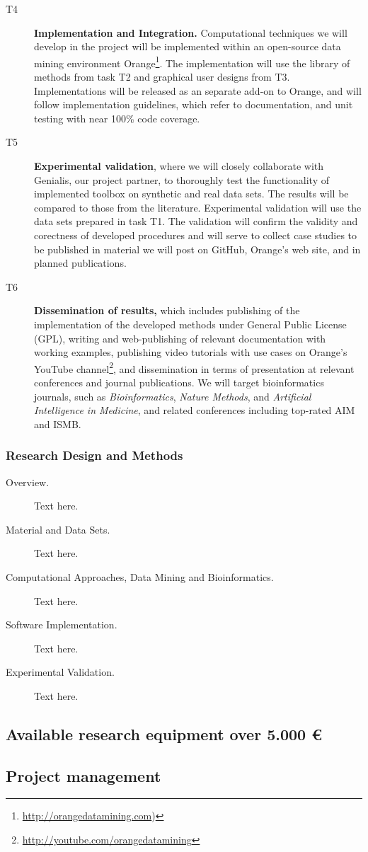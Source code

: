 \documentclass[11pt,a4paper]{article}
\renewcommand{\bf}{\textbf}
\begin{document}
\begin{description}
	\item[T4] \bf{Implementation and Integration.} Computational techniques we will develop in the project will be implemented within an open-source data mining environment Orange\footnote{\url{http://orangedatamining.com})}. The implementation will use the library of methods from task T2 and graphical user designs from T3. Implementations will be released as an separate add-on to Orange, and will follow implementation guidelines, which refer to documentation, and unit testing with near 100\% code coverage.
	\item[T5] \bf{Experimental validation}, where we will closely collaborate with Genialis, our project partner, to thoroughly test the functionality of implemented toolbox on synthetic and real data sets. The results will be compared to those from the literature. Experimental validation will use the data sets prepared in task T1. The validation will confirm the validity and corectness of developed procedures and will serve to collect case studies to be published in material we will post on GitHub, Orange's web site, and in planned publications.
	\item[T6] \bf{Dissemination of results,} which includes publishing of the implementation of the developed methods under General Public License (GPL), writing and web-publishing of relevant documentation with working examples, publishing video tutorials with use cases on Orange's YouTube channel\footnote{\url{http://youtube.com/orangedatamining}}, and dissemination in terms of presentation at relevant conferences and journal publications. We will target bioinformatics journals, such as {\em Bioinformatics}, {\em Nature Methods}, and {\em Artificial Intelligence in Medicine}, and related conferences including top-rated AIM and ISMB.
\end{description}

\subsubsection{Research Design and Methods}
\begin{description}
	\item[Overview.] Text here.
	\item[Material and Data Sets.] Text here.
	\item[Computational Approaches, Data Mining and Bioinformatics.] Text here.
	\item[Software Implementation.] Text here.
	\item[Experimental Validation.] Text here.
\end{description}

\subsection{Available research equipment over 5.000 €}

\subsection{Project management}
\end{document}
